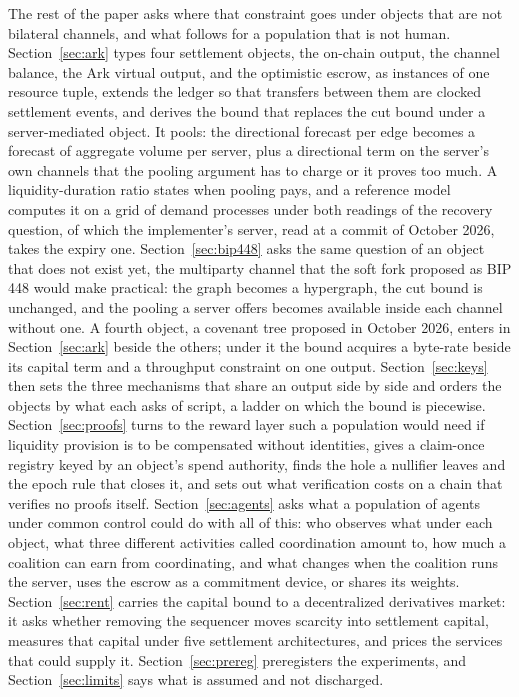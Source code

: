 \documentclass[11pt]{article}
\theoremstyle{plain}
\theoremstyle{definition}
\theoremstyle{remark}
\begin{document}
The rest of the paper asks where that constraint goes under objects that are not bilateral channels, and what follows for a population that is not human. Section~\ref{sec:ark} types four settlement objects, the on-chain output, the channel balance, the Ark virtual output, and the optimistic escrow, as instances of one resource tuple, extends the ledger so that transfers between them are clocked settlement events, and derives the bound that replaces the cut bound under a server-mediated object. It pools: the directional forecast per edge becomes a forecast of aggregate volume per server, plus a directional term on the server's own channels that the pooling argument has to charge or it proves too much. A liquidity-duration ratio states when pooling pays, and a reference model computes it on a grid of demand processes under both readings of the recovery question, of which the implementer's server, read at a commit of October 2026, takes the expiry one. Section~\ref{sec:bip448} asks the same question of an object that does not exist yet, the multiparty channel that the soft fork proposed as BIP 448 would make practical: the graph becomes a hypergraph, the cut bound is unchanged, and the pooling a server offers becomes available inside each channel without one. A fourth object, a covenant tree proposed in October 2026, enters in Section~\ref{sec:ark} beside the others; under it the bound acquires a byte-rate beside its capital term and a throughput constraint on one output. Section~\ref{sec:keys} then sets the three mechanisms that share an output side by side and orders the objects by what each asks of script, a ladder on which the bound is piecewise. Section~\ref{sec:proofs} turns to the reward layer such a population would need if liquidity provision is to be compensated without identities, gives a claim-once registry keyed by an object's spend authority, finds the hole a nullifier leaves and the epoch rule that closes it, and sets out what verification costs on a chain that verifies no proofs itself. Section~\ref{sec:agents} asks what a population of agents under common control could do with all of this: who observes what under each object, what three different activities called coordination amount to, how much a coalition can earn from coordinating, and what changes when the coalition runs the server, uses the escrow as a commitment device, or shares its weights. Section~\ref{sec:rent} carries the capital bound to a decentralized derivatives market: it asks whether removing the sequencer moves scarcity into settlement capital, measures that capital under five settlement architectures, and prices the services that could supply it. Section~\ref{sec:prereg} preregisters the experiments, and Section~\ref{sec:limits} says what is assumed and not discharged.
\end{document}
